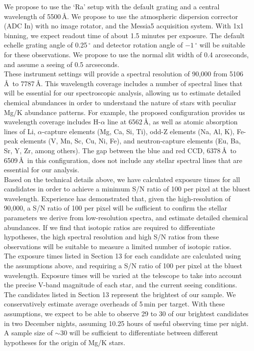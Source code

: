\documentclass{article}
\begin{document}
\begin{technicalinfo}
We propose to use the `Ra' setup with the default grating and a central wavelength of 5500\,\AA. We propose to use the atmospheric dispersion corrector (ADC In) with no image rotator, and the Messia5 acquisition system. With 1x1 binning, we expect readout time of about 1.5 minutes per exposure. The default echelle grating angle of 0.25\,$^\circ$ and detector rotation angle of $-1$\,$^\circ$ will be suitable for these observations. We propose to use the normal slit width of 0.4 arcseconds, and assume a seeing of 0.5 arcseconds.\\
 
These instrument settings will provide a spectral resolution of 90,000 from 5106\,\AA\ to 7787\,\AA. This wavelength coverage includes a number of spectral lines that will be essential for our spectroscopic analysis, allowing us to estimate detailed chemical abundances in order to understand the nature of stars with peculiar Mg/K abundance patterns. For example, the proposed configuration provides us wavelength coverage includes H-$\alpha$ line at 6562\,\AA, as well as atomic absorption lines of Li, $\alpha$-capture elements (Mg, Ca, Si, Ti), odd-Z elements (Na, Al, K), Fe-peak elements (V, Mn, Sc, Cu, Ni, Fe), and neutron-capture elements (Eu, Ba, Sr, Y, Zr, among others). The gap between the blue and red CCD, 6378\,\AA\ to 6509\,\AA\ in this configuration, does not include any stellar spectral lines that are essential for our analysis. \\

Based on the technical details above, we have calculated exposure times for all candidates in order to achieve a minimum S/N ratio of 100 per pixel at the bluest wavelength. Experience has demonstrated that, given the high-resolution of 90,000, a S/N ratio of 100 per pixel will be sufficient to confirm the stellar parameters we derive from low-resolution spectra, and estimate detailed chemical abundances. If we find that isotopic ratios are required to differentiate hypotheses, the high spectral resolution and high  S/N ratios from these  observations will be  suitable to measure a limited number of isotopic ratios.\\

The exposure times listed in Section 13 for each candidate are calculated using the assumptions above, and requiring a S/N ratio of 100 per pixel at  the bluest wavelength. Exposure times will be varied at the telescope to take into account the precise V-band magnitude of each star, and the current seeing conditions. The candidates listed in Section 13 represent the brightest of our sample. We conservatively estimate average overheads of 5\,min per target. With these assumptions, we expect to be able to observe 29 to 30 of our brightest candidates in two December nights, assuming 10.25 hours of useful observing time per night. A sample size of $\sim$30 will be sufficient to differentiate between different hypotheses for the origin of Mg/K stars.\\


\end{technicalinfo}
\end{document}
